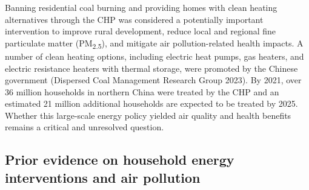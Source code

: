 \documentclass[
  letterpaper,
  DIV=11,
  numbers=noendperiod]{scrartcl}
\begin{document}
Banning residential coal burning and providing homes with clean heating
alternatives through the CHP was considered a potentially important
intervention to improve rural development, reduce local and regional
fine particulate matter (PM\textsubscript{2.5}), and mitigate air
pollution-related health impacts. A number of clean heating options,
including electric heat pumps, gas heaters, and electric resistance
heaters with thermal storage, were promoted by the Chinese government
(Dispersed Coal Management Research Group 2023). By 2021, over 36
million households in northern China were treated by the CHP and an
estimated 21 million additional households are expected to be treated by
2025. Whether this large-scale energy policy yielded air quality and
health benefits remains a critical and unresolved question.

\subsection{Prior evidence on household energy interventions and air
pollution}\label{prior-evidence-on-household-energy-interventions-and-air-pollution}
\end{document}
